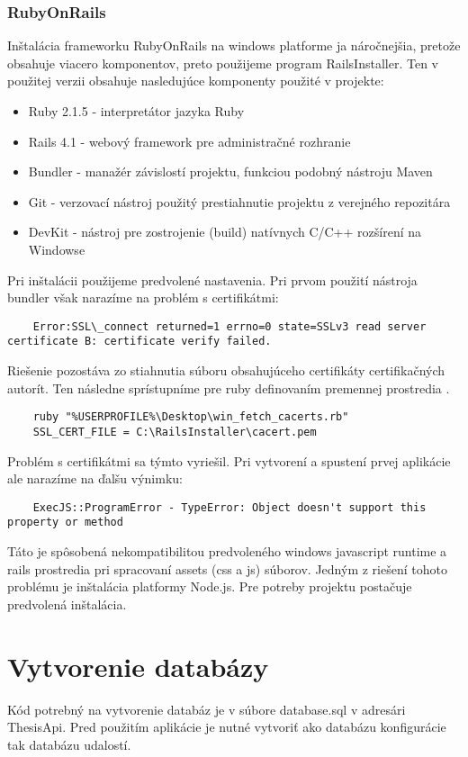 \subsubsection{RubyOnRails}	%
	Inštalácia frameworku RubyOnRails na windows platforme ja náročnejšia, pretože obsahuje viacero komponentov, preto použijeme program RailsInstaller. Ten v použitej verzii obsahuje nasledujúce komponenty použité v projekte:
	\begin{itemize}
		\item Ruby 2.1.5 - interpretátor jazyka Ruby
		\item Rails 4.1 - webový framework pre administračné rozhranie
		\item Bundler - manažér závislostí projektu, funkciou podobný nástroju Maven
		\item Git - verzovací nástroj použitý prestiahnutie projektu z verejného repozitára
		\item DevKit - nástroj pre zostrojenie (build) natívnych C/C++ rozšírení na Windowse
	\end{itemize}

	Pri inštalácii použijeme predvolené nastavenia. Pri prvom použití nástroja bundler však narazíme na problém s certifikátmi:
	\begin{lstlisting}
	Error:SSL\_connect returned=1 errno=0 state=SSLv3 read server certificate B: certificate verify failed.
	\end{lstlisting}
	Riešenie pozostáva zo stiahnutia súboru obsahujúceho certifikáty certifikačných autorít. Ten následne sprístupníme pre ruby definovaním premennej prostredia \cite{web:certificate-fix}.
	\begin{lstlisting}
	ruby "%USERPROFILE%\Desktop\win_fetch_cacerts.rb"
	SSL_CERT_FILE = C:\RailsInstaller\cacert.pem
	\end{lstlisting}
		
	Problém s certifikátmi sa týmto vyriešil. Pri vytvorení a spustení prvej aplikácie ale narazíme na ďalšu výnimku:
	\begin{lstlisting}
	ExecJS::ProgramError - TypeError: Object doesn't support this property or method
	\end{lstlisting}
	Táto je spôsobená nekompatibilitou predvoleného windows javascript runtime a rails prostredia pri spracovaní assets (css a js) súborov. Jedným z riešení tohoto problému je inštalácia platformy Node.js. Pre potreby projektu postačuje predvolená inštalácia.
	
\section{Vytvorenie databázy}
	Kód potrebný na vytvorenie databáz je v súbore database.sql v adresári ThesisApi. Pred použitím aplikácie je nutné vytvoriť ako databázu konfigurácie tak databázu udalostí.
	
